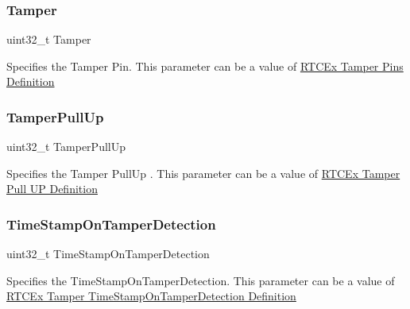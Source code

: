 \subsubsection{\texorpdfstring{Tamper}{Tamper}}
{\footnotesize\ttfamily uint32\+\_\+t Tamper}

Specifies the Tamper Pin. This parameter can be a value of \hyperlink{group___r_t_c_ex___tamper___pins___definitions}{R\+T\+C\+Ex Tamper Pins Definition} \mbox{\label{struct_r_t_c___tamper_type_def_a720d93fc9b3e57ec856279517a7e4203}} 
\subsubsection{\texorpdfstring{Tamper\+Pull\+Up}{TamperPullUp}}
{\footnotesize\ttfamily uint32\+\_\+t Tamper\+Pull\+Up}

Specifies the Tamper Pull\+Up . This parameter can be a value of \hyperlink{group___r_t_c_ex___tamper___pull___u_p___definitions}{R\+T\+C\+Ex Tamper Pull UP Definition} \mbox{\label{struct_r_t_c___tamper_type_def_ab0792219a611eb765a873285ac621f9a}} 
\subsubsection{\texorpdfstring{Time\+Stamp\+On\+Tamper\+Detection}{TimeStampOnTamperDetection}}
{\footnotesize\ttfamily uint32\+\_\+t Time\+Stamp\+On\+Tamper\+Detection}

Specifies the Time\+Stamp\+On\+Tamper\+Detection. This parameter can be a value of \hyperlink{group___r_t_c_ex___tamper___time_stamp_on_tamper_detection___definitions}{R\+T\+C\+Ex Tamper Time\+Stamp\+On\+Tamper\+Detection Definition} \mbox{\label{struct_r_t_c___tamper_type_def_a73dd50a4d440463bf9e1cb02b72ac706}} 
